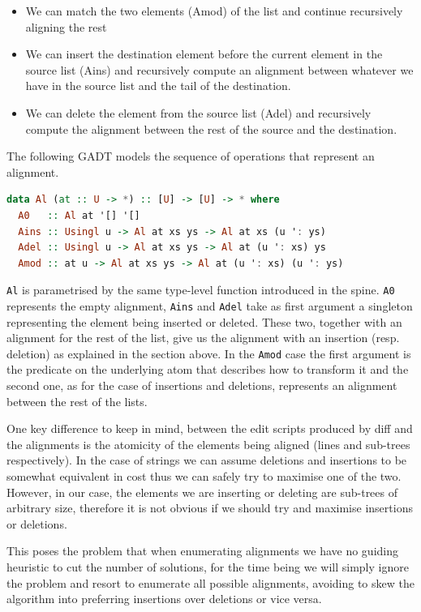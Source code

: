 \documentclass[11pt]{article}
\begin{document}
\begin{itemize}
\item
  We can match the two elements (Amod) of the list and continue
  recursively aligning the rest
\item
  We can insert the destination element before the current element in
  the source list (Ains) and recursively compute an alignment between
  whatever we have in the source list and the tail of the destination.
\item
  We can delete the element from the source list (Adel) and recursively
  compute the alignment between the rest of the source and the
  destination.
\end{itemize}


The following GADT models the sequence of operations that represent an 
alignment.

\begin{lstlisting}[language=haskell]
data Al (at :: U -> *) :: [U] -> [U] -> * where
  A0   :: Al at '[] '[]
  Ains :: Usingl u -> Al at xs ys -> Al at xs (u ': ys)
  Adel :: Usingl u -> Al at xs ys -> Al at (u ': xs) ys
  Amod :: at u -> Al at xs ys -> Al at (u ': xs) (u ': ys)
\end{lstlisting}

\texttt{Al} is parametrised by the same type-level function introduced in the spine. 
\texttt{A0} represents the empty alignment, \texttt{Ains} and \texttt{Adel} take as first argument
a singleton representing the element being inserted or deleted. These two, together
with an alignment for the rest of the list, give us the alignment with
an insertion (resp. deletion) as explained in the section above. In the
\texttt{Amod} case the first argument is the predicate on the underlying atom that describes how to transform 
it and the second one, as for the case of insertions and deletions, represents an  
alignment between the rest of the lists. 

One key difference to keep in mind, between the edit scripts produced by diff and the alignments is the atomicity 
of the elements being aligned (lines and sub-trees respectively). In the
case of strings we can assume deletions and insertions to be somewhat
equivalent in cost thus we can safely try to maximise one of the two.
However, in our case, the elements we are inserting or deleting are
sub-trees of arbitrary size, therefore it is not obvious if we should try and maximise
insertions or deletions.

This poses the problem that when enumerating alignments we have no guiding heuristic to cut the number
of solutions, for the time being we will simply ignore the problem and resort to enumerate
all possible alignments, avoiding to skew the algorithm into preferring
insertions over deletions or vice versa.
\end{document}
